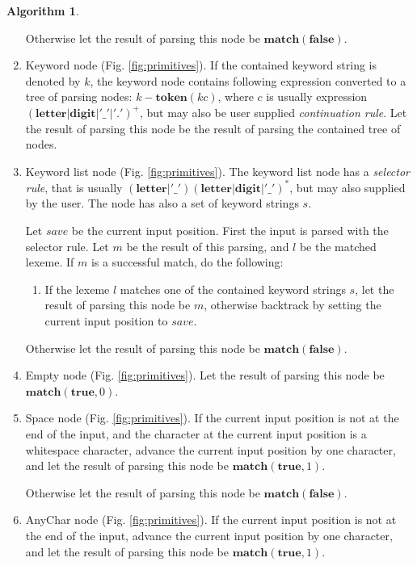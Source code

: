 \documentclass[a4paper,oneside,11pt]{book}
\theoremstyle{definition}
\newtheorem{algo}{Algorithm}[section]
\begin{document}
\begin{algo}
\begin{flushleft}
\begin{enumerate}
Otherwise let the result of parsing this node be $\textbf{match}(\textbf{false})$.

\item
Keyword node (Fig. \ref{fig:primitives}). If the contained keyword string is denoted by $k$,
the keyword node contains following expression converted to a tree of parsing nodes:
$k - \textbf{token}(k c)$, where $c$ is usually expression $(\textbf{letter}|\textbf{digit}|'\_'|'.')^+$,
but may also be user supplied \emph{continuation rule}.
Let the result of parsing this node be the result of parsing the contained tree of nodes.

\item
Keyword list node (Fig. \ref{fig:primitives}). The keyword list node has a \emph{selector rule},
that is usually $(\textbf{letter}|'\_')(\textbf{letter}|\textbf{digit}|'\_')^*$,
but may also supplied by the user. The node has also a set of keyword strings $s$.

Let $save$ be the current input position.
First the input is parsed with the selector rule.
Let $m$ be the result of this parsing, and $l$ be the matched lexeme.
If $m$ is a successful match, do the following:
\begin{enumerate}
\item
If the lexeme $l$ matches one of the contained keyword strings $s$,
let the result of parsing this node be $m$,
otherwise backtrack by  setting the current input position to $save$.
\end{enumerate}

Otherwise let the result of parsing this node be $\textbf{match}(\textbf{false})$.

\item
Empty node (Fig. \ref{fig:primitives}). Let the result of parsing this node be $\textbf{match}(\textbf{true}, 0)$.

\item
Space node (Fig. \ref{fig:primitives}). If the current input position is not at the end of the input,
and the character at the current input position is a whitespace character,
advance the current input position by one character,
and let the result of parsing this node be $\textbf{match}(\textbf{true}, 1)$.

Otherwise let the result of parsing this node be $\textbf{match}(\textbf{false})$.

\item
AnyChar node (Fig. \ref{fig:primitives}). If the current input position is not at the end of the input,
advance the current input position by one character,
and let the result of parsing this node be $\textbf{match}(\textbf{true}, 1)$.


\end{enumerate}
\end{flushleft}
\end{algo}
\end{document}
